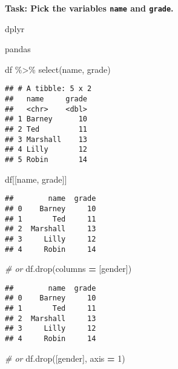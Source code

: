 \documentclass[
]{book}
\newenvironment{Shaded}{\begin{snugshade}}{\end{snugshade}}
\newcommand{\CommentTok}[1]{\textcolor[rgb]{0.56,0.35,0.01}{\textit{#1}}}
\newcommand{\DecValTok}[1]{\textcolor[rgb]{0.00,0.00,0.81}{#1}}
\newcommand{\FunctionTok}[1]{\textcolor[rgb]{0.00,0.00,0.00}{#1}}
\newcommand{\NormalTok}[1]{#1}
\newcommand{\OperatorTok}[1]{\textcolor[rgb]{0.81,0.36,0.00}{\textbf{#1}}}
\newcommand{\SpecialCharTok}[1]{\textcolor[rgb]{0.00,0.00,0.00}{#1}}
\newcommand{\StringTok}[1]{\textcolor[rgb]{0.31,0.60,0.02}{#1}}
\begin{document}
{\textbf{Task: Pick the variables \texttt{name} and \texttt{grade}.
}}

dplyr

pandas

\begin{Shaded}
\begin{Highlighting}[]
\NormalTok{df }\SpecialCharTok{\%\textgreater{}\%} 
  \FunctionTok{select}\NormalTok{(name, grade)}
\end{Highlighting}
\end{Shaded}

\begin{verbatim}
## # A tibble: 5 x 2
##   name     grade
##   <chr>    <dbl>
## 1 Barney      10
## 2 Ted         11
## 3 Marshall    13
## 4 Lilly       12
## 5 Robin       14
\end{verbatim}

\begin{Shaded}
\begin{Highlighting}[]
\NormalTok{df[[}\StringTok{\textquotesingle{}name\textquotesingle{}}\NormalTok{, }\StringTok{\textquotesingle{}grade\textquotesingle{}}\NormalTok{]]}
\end{Highlighting}
\end{Shaded}

\begin{verbatim}
##        name  grade
## 0    Barney     10
## 1       Ted     11
## 2  Marshall     13
## 3     Lilly     12
## 4     Robin     14
\end{verbatim}

\begin{Shaded}
\begin{Highlighting}[]
\CommentTok{\# or}
\NormalTok{df.drop(columns }\OperatorTok{=}\NormalTok{ [}\StringTok{\textquotesingle{}gender\textquotesingle{}}\NormalTok{])}
\end{Highlighting}
\end{Shaded}

\begin{verbatim}
##        name  grade
## 0    Barney     10
## 1       Ted     11
## 2  Marshall     13
## 3     Lilly     12
## 4     Robin     14
\end{verbatim}

\begin{Shaded}
\begin{Highlighting}[]
\CommentTok{\# or}
\NormalTok{df.drop([}\StringTok{\textquotesingle{}gender\textquotesingle{}}\NormalTok{], axis }\OperatorTok{=} \DecValTok{1}\NormalTok{)}
\end{Highlighting}
\end{Shaded}
\end{document}
